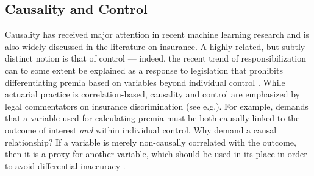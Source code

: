 \documentclass[11pt]{article} %
\makeatletter
\newcommand*{\eg}{e.g.\@\xspace}
\makeatother
\begin{document}
\subsection{Causality and Control}
\label{sec:causalitycontrol}
Causality has received major attention in recent machine learning research and is also widely discussed in the literature on insurance. A highly related, but subtly distinct notion is that of control --- indeed, the recent trend of responsibilization can to some extent be explained as a response to legislation that prohibits differentiating premia based on variables beyond individual control \citep{meyers2018enacting}.
While actuarial practice is correlation-based, causality and control are emphasized by legal commentators on insurance discrimination (see \eg \citep{abraham1985efficiency,gaulding1994race,avraham2013understanding,avraham2017discrimination}). For example, \citet{avraham2017discrimination} demands that a variable used for calculating premia must be both causally linked to the outcome of interest \textit{and} within individual control. Why demand a causal relationship? If a variable is merely non-causally correlated with the outcome, then it is a proxy for another variable, which should be used in its place in order to avoid differential inaccuracy \citep{avraham2013understanding}.
\end{document}
